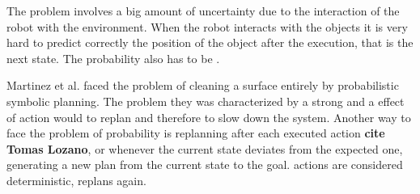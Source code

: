 The problem involves a big amount of uncertainty due to the interaction of the robot with the environment. When the robot  interacts with the objects\DM{,} it is very hard to predict correctly the position of the object after the execution, that is the next state.  The probability also has to be  .

Martinez et al. \citep{martinez2015planning} faced the problem of cleaning a surface entirely by probabilistic symbolic planning. The problem they  was characterized by a strong  and a  effect of  action would  to replan\DM{,} and therefore to slow down the system.
Another way to face the problem of probability is replanning after each executed action \textbf{cite Tomas Lozano}, or whenever the current state deviates from the expected one, generating a new plan from the current state to the goal.  actions are considered deterministic,  replans again. 

